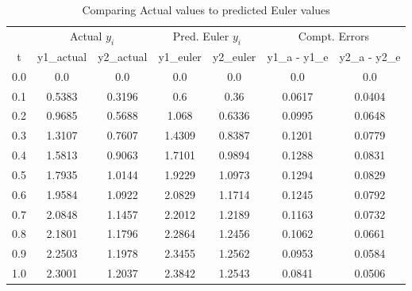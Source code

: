 \documentclass[12pt,oneside]{book}
\begin{document}
		\begin{table}[h!]
			\caption{Comparing Actual values to predicted Euler values}
			\begin{tabular}{ccccccc}
				\toprule
				& \multicolumn{2}{c}{Actual $ y_{i} $} & \multicolumn{2}{c}{Pred. Euler $ y_{i} $ } & \multicolumn{2}{c}{Compt. Errors} \\
				t & y1\_actual & y2\_actual & y1\_euler & y2\_euler & y1\_a - y1\_e & y2\_a - y2\_e \\ \midrule
				0.0 & 0.0 & 0.0 & 0.0 & 0.0 & 0.0 & 0.0 \\
				0.1 & 0.5383 & 0.3196 & 0.6 & 0.36 & 0.0617 & 0.0404 \\
				0.2 & 0.9685 & 0.5688 & 1.068 & 0.6336 & 0.0995 & 0.0648 \\
				0.3 & 1.3107 & 0.7607 & 1.4309 & 0.8387 & 0.1201 & 0.0779 \\
				0.4 & 1.5813 & 0.9063 & 1.7101 & 0.9894 & 0.1288 & 0.0831 \\
				0.5 & 1.7935 & 1.0144 & 1.9229 & 1.0973 & 0.1294 & 0.0829 \\
				0.6 & 1.9584 & 1.0922 & 2.0829 & 1.1714 & 0.1245 & 0.0792 \\
				0.7 & 2.0848 & 1.1457 & 2.2012 & 1.2189 & 0.1163 & 0.0732 \\
				0.8 & 2.1801 & 1.1796 & 2.2864 & 1.2456 & 0.1062 & 0.0661 \\
				0.9 & 2.2503 & 1.1978 & 2.3455 & 1.2562 & 0.0953 & 0.0584 \\
				1.0 & 2.3001 & 1.2037 & 2.3842 & 1.2543 & 0.0841 & 0.0506 \\
				\bottomrule
			\end{tabular}
		\end{table}
	
\end{document}
